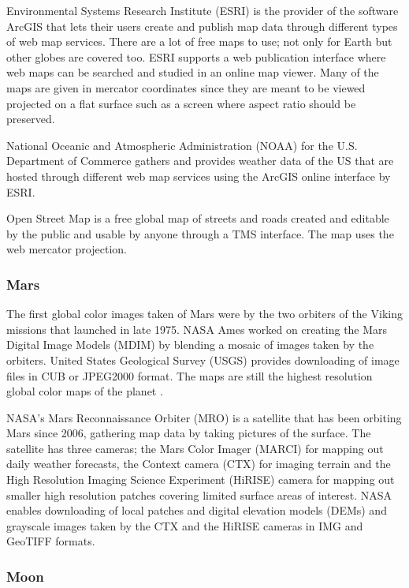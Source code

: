 Environmental Systems Research Institute (ESRI) is the provider of the software ArcGIS that lets their users create and publish map data through different types of web map services. There are a lot of free maps to use; not only for Earth but other globes are covered too. ESRI supports a web publication interface where web maps can be searched and studied in an online map viewer. Many of the maps are given in mercator coordinates since they are meant to be viewed projected on a flat surface such as a screen where aspect ratio should be preserved.

National Oceanic and Atmospheric Administration (NOAA) for the U.S. Department of Commerce gathers and provides weather data of the US that are hosted through different web map services using the ArcGIS online \cite{arcgis} interface by ESRI.

Open Street Map is a free global map of streets and roads created and editable by the public and usable by anyone through a TMS interface. The map uses the web mercator projection.

\subsubsection{Mars}

The first global color images taken of Mars were by the two orbiters of the Viking missions that launched in late 1975. NASA Ames worked on creating the Mars Digital Image Models (MDIM) by blending a mosaic of images taken by the orbiters. United States Geological Survey (USGS) provides downloading of image files in CUB or JPEG2000 format. The maps are still the highest resolution global color maps of the planet \cite{viking}.

NASA's Mars Reconnaissance Orbiter (MRO) is a satellite that has been orbiting Mars since 2006, gathering map data by taking pictures of the surface. The satellite has three cameras; the Mars Color Imager (MARCI) for mapping out daily weather forecasts, the Context camera (CTX) for imaging terrain and the High Resolution Imaging Science Experiment (HiRISE) camera for mapping out smaller high resolution patches covering limited surface areas of interest. NASA enables downloading of local patches and digital elevation models (DEMs) and grayscale images taken by the CTX \cite{ctx} and the HiRISE \cite{hirise} cameras in IMG and GeoTIFF formats.

\subsubsection{Moon}

